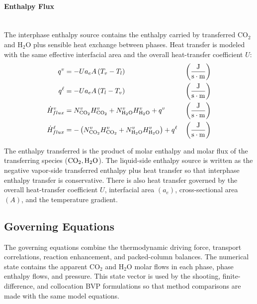                 \paragraph{Enthalpy Flux}\mbox{}\\[0.5em]
                The interphase enthalpy source contains the enthalpy carried by transferred CO$_2$ and H$_2$O plus sensible heat exchange between phases. Heat transfer is modeled with the same effective interfacial area and the overall heat-transfer coefficient $U$:
                \begin{align}
                    q^{\vap} &= -U a_e A \left(T_v-T_l\right) && \left(\frac{\unit{J}}{\unit{s\cdot m}} \right) \\
                    q^{\liq} &= -U a_e A \left(T_l-T_v\right) && \left(\frac{\unit{J}}{\unit{s\cdot m}} \right) \\
                    \dot{H}^{\vap}_{flux} &=   N^{\vap}_{ \COtwo}H^{\vap}_{ \COtwo} + N^{\vap}_{ \HtwoO}H^{\vap}_{ \HtwoO} +  q^{\vap} && \left(\frac{\unit{J}}{\unit{s\cdot m}} \right) \\
                    \dot{H}^{\liq}_{flux} &= -\left(N^{\vap}_{ \COtwo}H^{\vap}_{ \COtwo} + N^{\vap}_{ \HtwoO}H^{\vap}_{ \HtwoO}\right) +  q^{\liq} && \left(\frac{\unit{J}}{\unit{s\cdot m}} \right)
                \end{align}

                The enthalpy transferred is the product of molar enthalpy and molar flux of the transferring species ($\COtwo, \HtwoO$). The liquid-side enthalpy source is written as the negative vapor-side transferred enthalpy plus heat transfer so that interphase enthalpy transfer is conservative. There is also heat transfer governed by the overall heat-transfer coefficient $U$, interfacial area $\left(a_e\right)$, cross-sectional area $\left(A\right)$, and the temperature gradient.

        \subsection{Governing Equations}\label{subsec:governing-equations}
            The governing equations combine the thermodynamic driving force, transport correlations, reaction enhancement, and packed-column balances. The numerical state contains the apparent CO$_2$ and H$_2$O molar flows in each phase, phase enthalpy flows, and pressure. This state vector is used by the shooting, finite-difference, and collocation BVP formulations so that method comparisons are made with the same model equations.

